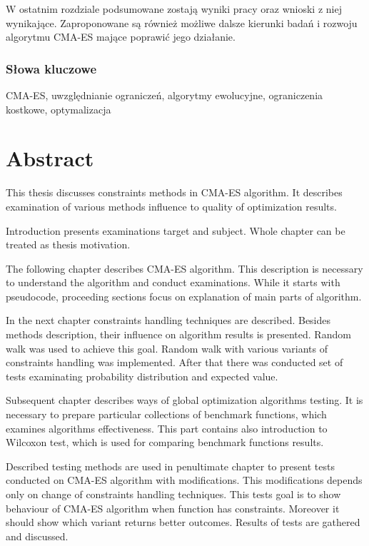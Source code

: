 \documentclass{mini}
\begin{document}
W ostatnim rozdziale podsumowane zostają wyniki pracy oraz wnioski z niej wynikające. Zaproponowane są również możliwe dalsze kierunki badań i rozwoju algorytmu CMA-ES mające poprawić jego działanie.

\subsubsection*{Słowa kluczowe}
CMA-ES, uwzględnianie ograniczeń, algorytmy ewolucyjne, ograniczenia kostkowe, optymalizacja

\pagebreak

\section{Abstract}
\hspace{3,4ex}This thesis discusses constraints methods in CMA-ES algorithm. It describes examination of various methods influence to quality of optimization results.

Introduction presents examinations target and subject. Whole chapter can be treated as thesis motivation.

The following chapter describes CMA-ES algorithm. This description is necessary to understand the algorithm and conduct examinations. While it starts with pseudocode, proceeding sections focus on explanation of main parts of algorithm.

In the next chapter constraints handling techniques are described. Besides methods description, their influence on algorithm results is presented. Random walk was used to achieve this goal. Random walk with various variants of constraints handling was implemented. After that there was conducted set of tests examinating probability distribution and expected value.

Subsequent chapter describes ways of global optimization algorithms testing. It is necessary to prepare particular collections of benchmark functions, which examines algorithms effectiveness. This part contains also introduction to Wilcoxon test, which is used for comparing benchmark functions results.

Described testing methods are used in penultimate chapter to present tests conducted on CMA-ES algorithm with modifications. This modifications depends only on change of constraints handling techniques. This tests goal is to show behaviour of CMA-ES algorithm when function has constraints. Moreover it should show which variant returns better outcomes. Results of tests are gathered and discussed.
\end{document}
